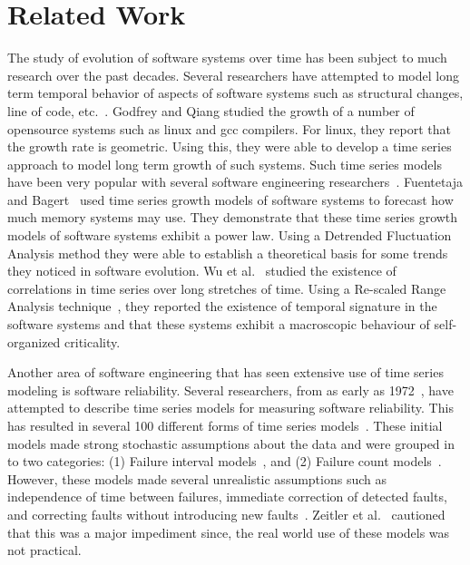 \documentclass[sigconf, preprint]{acmart}
\begin{document}
\section{Related Work}
\label{sect:related}

The study of evolution of software systems over time has been subject to much research over the past decades. Several researchers have attempted to model long term temporal behavior of aspects of software systems such as structural changes, line of code, etc.~\cite{godfrey2001growth, lehman1985program}.  Godfrey and Qiang studied the growth of a number of opensource systems such as linux and gcc compilers. For linux, they report that the growth rate is geometric. Using this, they were able to develop a time series approach to model long term growth of such systems. Such time series models have been very popular with several software engineering researchers~\cite{lehman1985program, fuentetaja2002software, turski1996reference, wu2006seeking}. Fuentetaja and Bagert~\cite{fuentetaja2002software} used time series growth models of software systems to forecast how much memory systems may use. They demonstrate that these time series growth models of software systems exhibit a power law. Using a Detrended Fluctuation Analysis method they were able to establish a theoretical basis for some trends they noticed in software evolution. Wu et al.~\cite{wu2006seeking} studied the existence of correlations in time series over long stretches of time. Using a Re-scaled Range Analysis technique~\cite{hurst1951long}, they reported the existence of temporal signature in the software systems and that these systems exhibit a macroscopic behaviour of self-organized criticality. 


Another area of software engineering that has seen extensive use of time series 
modeling is software reliability. Several researchers, from as early as
1972~\cite{jel72}, have attempted to describe time series models for measuring 
software reliability. This has resulted in several 100 different forms 
of time series models~\cite{Lyu07}. These initial models made strong stochastic 
assumptions about the data and were grouped in to two categories: (1) Failure 
interval models~\cite{jel72, goel85}, and (2) Failure count 
models~\cite{goel79, lyu96}. However, these models made several 
unrealistic assumptions such as independence of time between failures, 
immediate correction of detected faults, and correcting faults without 
introducing new faults~\cite{goel85, Zeitler91, wood97}. Zeitler et al.~\cite{Zeitler91} cautioned that this was a major impediment since, the real world use of these models was not practical. 
\end{document}
